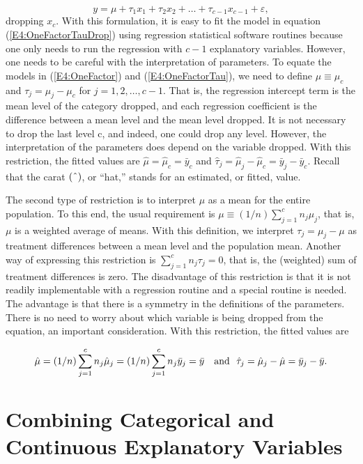 \begin{equation}  \label{E4:OneFactorTauDrop}
y=\mu +\tau_1x_1+\tau_2x_2+\ldots +\tau _{c-1}x_{c-1}+\varepsilon,
\end{equation}
dropping $x_c$. With this formulation, it is easy to fit the model
in equation (\ref{E4:OneFactorTauDrop}) using regression statistical
software routines because one only needs to run the regression with
$c-1$ explanatory variables. However, one needs to be careful with
the interpretation of parameters. To equate the models in
(\ref{E4:OneFactor}) and (\ref{E4:OneFactorTau}), we need to define
$\mu \equiv \mu_c$ and $\tau_j=\mu_j-\mu_c$ for $j=1,2,\ldots ,c-1$.
That is, the regression intercept term is the mean level of the
category dropped, and each regression coefficient is the difference
between a mean level and the mean level dropped. It is not necessary
to drop the last level c, and indeed, one could drop any level.
However, the interpretation of the parameters does depend on the
variable dropped. With this restriction, the fitted values are
$\hat{\mu}=\hat{\mu}_c=\bar{y}_c$ and
$\hat{\tau}_j=\hat{\mu}_j-\hat{\mu}_c=\bar{y}_j-\bar{y}_c$. Recall
that the carat $(\symbol{94})$, or ``hat,'' stands for an estimated,
or fitted, value.

The second type of restriction is to
interpret $\mu $ as a mean for the entire population. To this end,
the usual requirement is $\mu \equiv (1/n) \sum_{j=1}^c n_j \mu_j$,
that is, $\mu $ is a weighted average of means. With this
definition, we interpret $\tau_j = \mu _j - \mu$ as treatment
differences between a mean level and the population mean. Another
way of expressing this restriction is $\sum_{j=1}^{c}n_j\tau_j=0 $,
that is, the (weighted) sum of treatment differences is zero. The
disadvantage of this restriction is that it is not readily
implementable with a regression routine and a special routine is
needed. The advantage is that there is a symmetry in the definitions
of the parameters. There is no need to worry about which variable is
being dropped from the equation, an important consideration. With
this restriction, the fitted values are

\begin{equation*}
\hat{\mu}=(1/n)\sum_{j=1}^{c}n_j\hat{\mu}_j=(1/n)\sum_{j=1}^{c}n_j\bar{%
y}_j=\bar{y}\text{ \ \ and \ }\hat{\tau}_j=\hat{\mu}_j-\hat{\mu}=\bar{y%
}_j-\bar{y}.
\end{equation*}

\section{Combining Categorical and Continuous Explanatory Variables}

